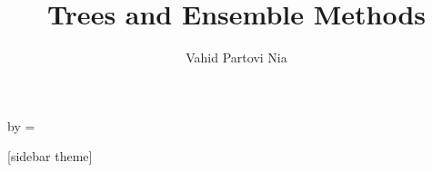 

\usepackage{listings}
\usepackage{xcolor}
\def \y {\mathbf y}
\def \z {\mathbf z}
\def \Z {\mathbf Z}
\def \X {\mathbf X}
\def \A {\mathbf A}
\def \t {^\top}
\def \inv {^ {-1}}
\def \x {\mathbf x}
\def \bbeta {\boldsymbol \beta}
\def \eeps {\boldsymbol \varepsilon}
\def \TV {\mathrm{TV}}
\def \Radio {\mathrm{Radio}}
\def \Newspaper {\mathrm{Newspaper}}
\def \Sales {\mathrm{Sales}}
\def \Balance {\mathrm{Balance}}
\def \Default {\mathrm{Default}}
\def \M {\mathcal{M}}

\def \r {\mathbf{r}}
\def \e {\mathbf{e}}

\def \RSS {\mathrm{RSS}}

\def \E {\mathrm{E}}
\def \P {\mathbf{P}}

\def \V {\mathrm{V}}
\def \cor {\mathrm{cor}}

\def \SSigma {\boldsymbol{\Sigma}}
\def \LLambda {\boldsymbol{\Lambda}}
\def \pphi {\boldsymbol{\phi}}
\def \PPhi {\boldsymbol{\Phi}}
\def \mmu {\boldsymbol{\mu}}
\def \ttheta {\boldsymbol{\theta}}



\title[]{Trees and Ensemble Methods}   
\author[]{Vahid Partovi Nia} 
\date{}


\makeatletter
  \begin{frame}[plain]
    \hspace*{-\beamer@leftsidebar}%
    \advance\textwidth by \beamer@leftsidebar\relax
    \beamer@leftsidebar=\z@
    \begin{minipage}{\textwidth}\par%
      \maketitle
    \end{minipage}
  \end{frame}
  \makeatother




[sidebar theme]

